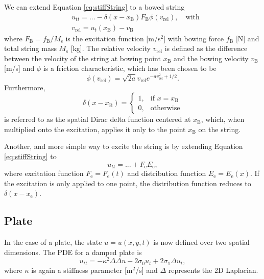 \documentclass{article}
\begin{document}
We can extend Equation \eqref{eq:stiffString} to a bowed string \cite{Bilbao2009:NumericalSoundSynthesis} 
\begin{align}
    \label{eq:bowedString} &u_{tt} = ... - \delta(x-x_\text{B})F_\text{B}\phi(v_\text{rel}), \quad \text{with} \\
    &v_\text{rel} = u_t(x_\text{B}) - v_\text{B}
\end{align}
where $F_\text{B} = f_\text{B}/ M_\text{s}$ is the excitation function [m/s$^2$] with bowing force $f_\text{B}$ [N] and total string mass $M_\text{s}$ [kg]. The relative velocity $v_\text{rel}$ is defined as the difference between the velocity of the string at bowing point $x_\text{B}$ and the bowing velocity $v_\text{B}$ [m/s] and $\phi$ is a friction characteristic, which has been chosen to be \cite{Bilbao2009:NumericalSoundSynthesis}
\begin{equation}
    \phi(v_\text{rel}) = \sqrt{2a}v_\text{rel} e^{-av_\text{rel}^2+1/2}.
\end{equation}
Furthermore,
\begin{equation} \label{eq:dirac}
    \delta(x-x_\text{B}) =
\begin{cases}
    1, & \text{if } x=x_\text{B}\\
    0,              & \text{otherwise}
\end{cases}
\end{equation}
is referred to as the spatial Dirac delta function centered at $x_\text{B}$, which, when multiplied onto the excitation, applies it only to the point $x_\text{B}$ on the string.

Another, and more simple way to excite the string is by extending Equation \eqref{eq:stiffString} to
\begin{equation}
    \label{eq:excitedString} u_{tt} = ... + F_\text{e}E_\text{e},
\end{equation}
where excitation function $F_\text{e} = F_\text{e}(t)$ and distribution function $E_\text{e} = E_\text{e}(x)$. If the excitation is only applied to one point, the distribution function reduces to $\delta(x-x_\text{e})$.
\subsection{Plate}\label{subsec:platePDE}
In the case of a plate, the state $u = u(x,y,t)$ is now defined over two spatial dimensions. The PDE for a damped plate is \cite{Bilbao2009:NumericalSoundSynthesis}
\begin{equation}\label{eq:platePDE}
    u_{tt} = -\kappa^2 \Delta\Delta u - 2 \sigma_0 u_{t} + 2\sigma_1 \Delta u_{t},
\end{equation}
where $\kappa$ is again a stiffness parameter [m$^2$/s] and $\Delta$ represents the 2D Laplacian.
\end{document}
